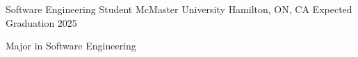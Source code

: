 

\begin{cventries}
	
	\cventry
	{Software Engineering Student} %
	{McMaster University} %
	{Hamilton, ON, CA} %
	{Expected Graduation 2025} %
	{
		\begin{cvitems} %
			\item {Major in Software Engineering}
		\end{cvitems}
	}
	
\end{cventries}

